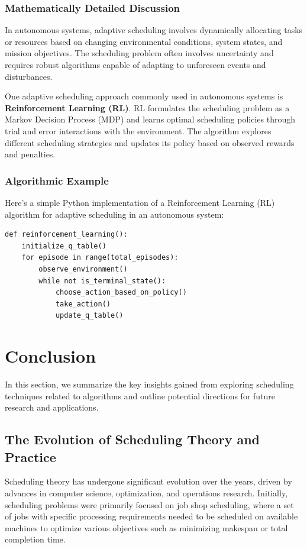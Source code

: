 \documentclass[12pt]{book} %
\begin{document}
\subsubsection{Mathematically Detailed Discussion}
In autonomous systems, adaptive scheduling involves dynamically allocating tasks or resources based on changing environmental conditions, system states, and mission objectives. The scheduling problem often involves uncertainty and requires robust algorithms capable of adapting to unforeseen events and disturbances.

One adaptive scheduling approach commonly used in autonomous systems is \textbf{Reinforcement Learning (RL)}. RL formulates the scheduling problem as a Markov Decision Process (MDP) and learns optimal scheduling policies through trial and error interactions with the environment. The algorithm explores different scheduling strategies and updates its policy based on observed rewards and penalties.

\subsubsection{Algorithmic Example}
Here's a simple Python implementation of a Reinforcement Learning (RL) algorithm for adaptive scheduling in an autonomous system:
\FloatBarrier
\begin{lstlisting}
def reinforcement_learning():
    initialize_q_table()
    for episode in range(total_episodes):
        observe_environment()
        while not is_terminal_state():
            choose_action_based_on_policy()
            take_action()
            update_q_table()
\end{lstlisting}
\FloatBarrier

\section{Conclusion}
In this section, we summarize the key insights gained from exploring scheduling techniques related to algorithms and outline potential directions for future research and applications.

\subsection{The Evolution of Scheduling Theory and Practice}
Scheduling theory has undergone significant evolution over the years, driven by advances in computer science, optimization, and operations research. Initially, scheduling problems were primarily focused on job shop scheduling, where a set of jobs with specific processing requirements needed to be scheduled on available machines to optimize various objectives such as minimizing makespan or total completion time.
\end{document}
